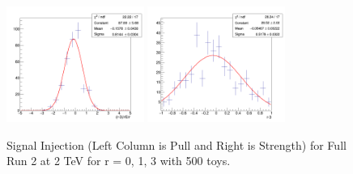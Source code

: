 \begin{figure}[!htb]
	\includegraphics[width=0.4\textwidth]{Figures/signalInjection3_500_sigpull_2000.png}
	\includegraphics[width=0.4\textwidth]{Figures/signalInjection3_500_sigstrength_2000.png}
	\caption{Signal Injection (Left Column is Pull and Right is Strength) for Full Run 2 at 2 TeV for r = 0, 1, 3 with 500 toys.}
	\label{fig:signalInjection2000plot}
\end{figure}

